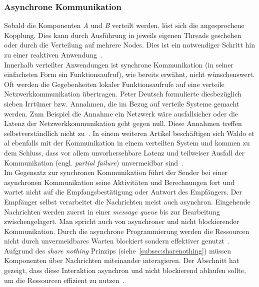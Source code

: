 \subsubsection{Asynchrone Kommunikation}
Sobald die Komponenten \textit{A} und \textit{B} verteilt werden, löst sich die angesprochene Kopplung. Dies kann durch Ausführung in jeweils eigenen Threads geschehen oder durch die Verteilung auf mehrere Nodes. Dies ist ein notwendiger Schritt hin zu einer reaktiven Anwendung~\cite[S.~22]{kuhn_reactive_2015}.\\
Innerhalb verteilter Anwendungen ist synchrone Kommunikation (in seiner einfachsten Form ein Funktionsaufruf), wie bereits erwähnt, nicht wünschenswert. Oft werden die Gegebenheiten lokaler Funktionsaufrufe auf eine verteile Netzwerkkommunikation übertragen. Peter Deutsch formulierte diesbezüglich sieben Irrtümer bzw. Annahmen, die im Bezug auf verteile Systeme gemacht werden. Zum Beispiel die Annahme ein Netzwerk wäre ausfallsicher oder die Latenz der Netzwerkkommunikation geht gegen null. Diese Annahmen treffen selbstverständlich nicht zu~\cite[S.~1]{rotem_fallacies_2008}. In einem weiteren Artikel beschäftigen sich Waldo et al ebenfalls mit der Kommunikation in einem verteilten System und kommen zu dem Schluss, dass vor allem unvorhersehbare Latenz und teilweiser Ausfall der Kommunikation (engl. \textit{partial failure}) unvermeidbar sind~\cite{waldo_note_1994}.\\
Im Gegensatz zur synchronen Kommunikation führt der Sender bei einer asynchronen Kommunikation seine Aktivitäten und Berechnungen fort und wartet nicht auf die Empfangsbestätigung oder Antwort des Empfängers. Der Empfänger selbst verarbeitet die Nachrichten meist auch asynchron. Eingehende Nachrichten werden zuerst in einer \textit{message queue} bis zur Bearbeitung zwischengelagert. Man spricht auch von asynchroner und nicht blockierender Kommunikation. Durch die asynchrone Programmierung werden die Ressourcen nicht durch unvermeidbares Warten blockiert sondern effektiver genutzt~\cite[S.~48]{kuhn_reactive_2015}.\\

Aufgrund des \textit{share nothing} Prinzips (siehe~\ref{subsec:sharenothing}) müssen Komponenten über Nachrichten miteinander interagieren. Der Abschnitt hat gezeigt, dass diese Interaktion asynchron und nicht blockierend ablaufen sollte, um die Ressourcen effizient zu nutzen~\cite[S.~48~\&~S.~49]{kuhn_reactive_2015}.

\pagebreak

